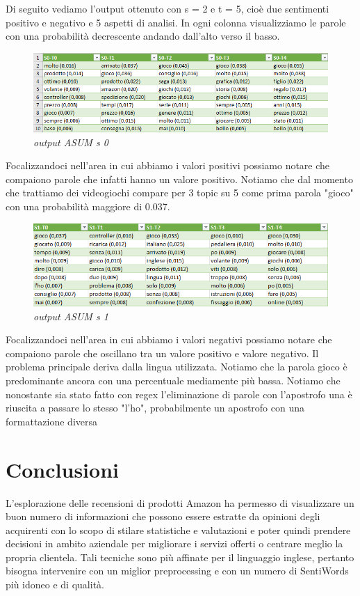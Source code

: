 \documentclass[a4paper,12pt]{article}
\begin{document}
\noindent Di seguito vediamo l'output ottenuto con s = 2 e t = 5, cioè due sentimenti positivo e negativo e 5 aspetti di analisi. In ogni colonna visualizziamo le parole con una probabilità decrescente andando dall'alto verso il basso.

\begin{figure}[H]
	\centering
	\includegraphics[width=0.9\linewidth]{img/outputASUM0.png}
	\caption{\textit{output ASUM s 0}}
\end{figure}

\noindent Focalizzandoci nell'area in cui abbiamo i valori positivi possiamo notare che compaiono parole che infatti hanno un valore positivo. Notiamo che dal momento che trattiamo dei videogiochi compare per 3 topic su 5 come prima parola "gioco" con una probabilità maggiore di 0.037. 

\begin{figure}[H]
	\centering
	\includegraphics[width=0.9\linewidth]{img/outputASUM1.png}
	\caption{\textit{output ASUM s 1}}
\end{figure}

\noindent Focalizzandoci nell'area in cui abbiamo i valori negativi possiamo notare che compaiono parole che oscillano tra un valore positivo e valore negativo. Il problema principale deriva dalla lingua utilizzata. Notiamo che la parola gioco è predominante ancora con una percentuale mediamente più bassa. Notiamo che nonostante sia stato fatto con regex l'eliminazione di parole con l'apostrofo una è riuscita a passare lo stesso "l'ho", probabilmente un apostrofo con una formattazione diversa

\section{Conclusioni}
L’esplorazione delle recensioni di prodotti Amazon ha permesso di visualizzare un buon numero di informazioni che possono essere estratte da opinioni degli acquirenti con lo scopo di stilare statistiche e valutazioni e poter quindi prendere decisioni in ambito aziendale per migliorare i servizi offerti o centrare meglio la
propria clientela. Tali tecniche sono più affinate per il linguaggio inglese, pertanto bisogna intervenire con un miglior preprocessing e con un numero di SentiWords più idoneo e di qualità.
\end{document}
